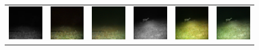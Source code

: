 \begin{figure}[htp!]
\begin{tabularx}{\textwidth}{Y Y Y !{\space} Y Y Y}
        \includegraphics{gfx/diffusion-sampling-full-vs-high-pass-filter-qual/nir_S2_B06_R3_PICT3848.jpg} & \includegraphics{gfx/diffusion-sampling-full-vs-high-pass-filter-qual/full-pass_S2_B06_R3_PICT3848.png} & \includegraphics{gfx/diffusion-sampling-full-vs-high-pass-filter-qual/high-pass_S2_B06_R3_PICT3848.png} & \includegraphics{gfx/diffusion-sampling-full-vs-high-pass-filter-qual/nir_S2_B07_R1_PICT3274.jpg} & \includegraphics{gfx/diffusion-sampling-full-vs-high-pass-filter-qual/full-pass_S2_B07_R1_PICT3274.png} & \includegraphics{gfx/diffusion-sampling-full-vs-high-pass-filter-qual/high-pass_S2_B07_R1_PICT3274.png}

\end{tabularx}
\end{figure}

